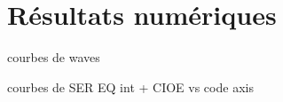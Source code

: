 \section{Résultats numériques}

\begin{TODO}
  courbes de waves
\end{TODO}

courbes de SER EQ int + CIOE vs code axis